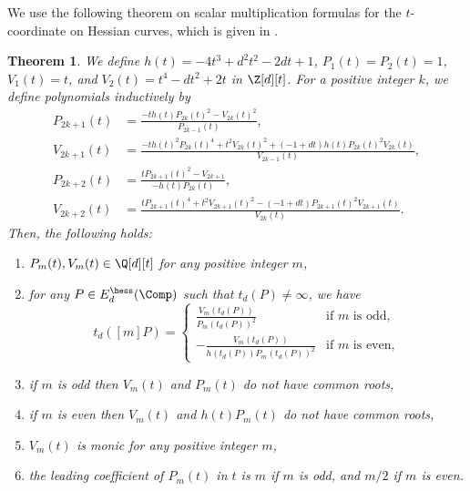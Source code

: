 \documentclass{amsart}
\newtheorem{theorem}{Theorem}[section]
\theoremstyle{definition}
\theoremstyle{remark}
\numberwithin{equation}{section}
\begin{document}
We use the following theorem on scalar multiplication formulas
for the $t$-coordinate on Hessian curves,
which is given in \cite{FouazouLontouo2023}.
\begin{theorem}\label{thm:division_polynomials_hess}
    We define $h(t) = -4t^3 + d^2 t^2 - 2 d t + 1$,
    $P_1(t) = P_2(t) = 1$,
    $V_1(t) = t$, and $V_2(t) = t^4 - d t^2 + 2t$ in $\Z[d][t]$.
    For a positive integer $k$,
    we define polynomials inductively by
    \begin{align*}
        P_{2k+1}(t) &= \frac{-th(t) P_{2k}(t)^2 - V_{2k}(t)^2}{P_{2k-1}(t)},\\
        V_{2k+1}(t) &= \frac{-th(t)^2P_{2k}(t)^4 + t^2V_{2k}(t)^2
            + (-1 + dt)h(t)P_{2k}(t)^2 V_{2k}(t)}
            {V_{2k-1}(t)},\\
        P_{2k+2}(t) &= \frac{tP_{2k+1}(t)^2 - V_{2k+1}}{-h(t)P_{2k}(t)},\\
        V_{2k+2}(t) &= \frac{t P_{2k+1}(t)^4 + t^2 V_{2k+1}(t)^2
            - (-1 + dt) P_{2k+1}(t)^2 V_{2k+1}(t)}
            {V_{2k}(t)}.
    \end{align*}
    Then, the following holds:
    \begin{enumerate}
        \item $P_m(t), V_m(t) \in \Q[d][t]$
            for any positive integer $m$, \label{item:division_polynomials_hess_th1start}
        \item for any $P \in E_d^\hess(\Comp)$ such that $t_d(P) \neq \infty$,
            we have
            \begin{equation*}
                t_d([m]P) = \begin{cases}
                        \frac{V_m(t_d(P))}{P_m(t_d(P))^2}
                        & \text{if } m \text{ is odd},\\
                        -\frac{V_m(t_d(P))}{h(t_d(P))P_m(t_d(P))^2}
                        & \text{if } m \text{ is even},
                    \end{cases}
            \end{equation*} \label{item:division_polynomials_hess_mult}
        \item if $m$ is odd then $V_m(t)$ and $P_m(t)$ do not have common roots, \label{item:division_polynomials_hess_th1mid}
        \item if $m$ is even then $V_m(t)$ and $h(t)P_m(t)$ do not have common roots, \label{item:division_polynomials_hess_th1end}
        \item $V_m(t)$ is monic for any positive integer $m$, \label{item:division_polynomials_hess_prop1start}
        \item the leading coefficient of $P_m(t)$ in $t$ is $m$ if $m$ is odd,
            and $m/2$ if $m$ is even. \label{item:division_polynomials_hess_prop1end}
    \end{enumerate}
\end{theorem}
\end{document}
